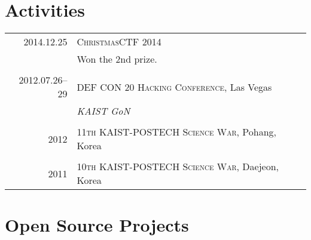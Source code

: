 \documentclass[a4paper,10pt]{article}
\begin{document}
\section{Activities}
\begin{tabular}{r|p{11cm}}
  \textsc{2014.12.25} & \textsc{ChristmasCTF 2014} \\
                      & Won the 2nd prize. \\
  \multicolumn{2}{c}{} \\

  \textsc{2012.07.26--29} & \textsc{DEF CON 20 Hacking Conference}, Las Vegas \\
                          & \emph{KAIST GoN} \\
  \multicolumn{2}{c}{} \\

  \textsc{2012} & \textsc{11th KAIST-POSTECH Science War}, Pohang, Korea \\
  \multicolumn{2}{c}{} \\

  \textsc{2011} & \textsc{10th KAIST-POSTECH Science War}, Daejeon, Korea \\
\end{tabular}


%

\section{Open Source Projects}
\end{document}
